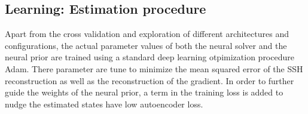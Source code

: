 \begin{bibunit}
\subsection{Learning: Estimation procedure}
Apart from the cross validation and exploration of different architectures and configurations, the actual parameter values of both the neural solver and the neural prior are trained using a standard deep learning otpimization procedure Adam. There parameter are tune to minimize the mean squared error of the SSH reconstruction as well as  the reconstruction of the gradient. In order to further guide the weights of the neural prior, a term in the training loss is added to nudge the estimated states have low autoencoder loss.

%
%
%

\end{bibunit}
